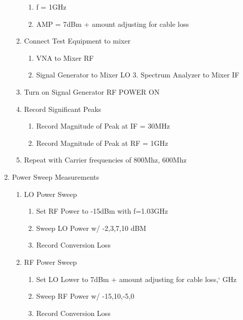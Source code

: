 \documentclass[journal]{IEEEtran}
\begin{document}
\begin{enumerate}
\begin{enumerate}
\begin{enumerate}
                        \item f = 1GHz
                        \item AMP = 7dBm + amount adjusting for cable loss
                    \end{enumerate}
              \item Connect Test Equipment to mixer
                    \begin{enumerate}
                        \item VNA to Mixer RF
                        \item Signal Generator to Mixer LO
                              3. Spectrum Analyzer to Mixer IF
                    \end{enumerate}
              \item Turn on Signal Generator RF POWER ON
              \item Record Significant Peaks
                    \begin{enumerate}
                        \item Record Magnitude of Peak at IF = 30MHz
                        \item Record Magnitude of Peak at RF = 1GHz
                    \end{enumerate}
              \item Repeat with Carrier frequencies of 800Mhz, 600Mhz
          \end{enumerate}
    \item Power Sweep Measurements
          \begin{enumerate}
              \item LO Power Sweep
                    \begin{enumerate}
                        \item Set RF Power to -15dBm with f=1.03GHz
                        \item Sweep LO Power w/ -2,3,7,10 dBM
                        \item Record Conversion Loss
                    \end{enumerate}
              \item RF Power Sweep
                    \begin{enumerate}
                        \item Set LO Lower to  7dBm + amount adjusting for cable loss,` GHz
                        \item Sweep RF Power w/ -15,10,-5,0
                        \item Record Conversion Loss
                    \end{enumerate}
          \end{enumerate}
\end{enumerate}
\end{document}

